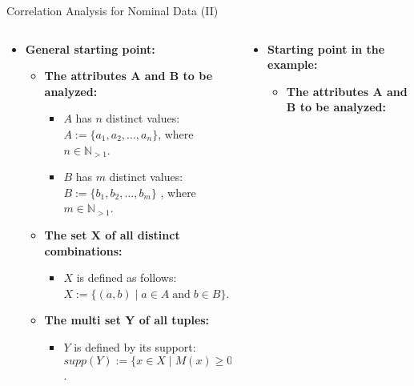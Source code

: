 \begin{frame}{Correlation Analysis for Nominal Data (II)}
	\begin{columns}
		\begin{column}{0.5\textwidth}
			\begin{itemize}
				\item \textbf{General starting point:}
				      \begin{itemize}
					      \item \textbf{The attributes A and B to be analyzed:}
					            \begin{itemize}
						            \item $A$ has $n$ distinct values: $A :=
							                  \{a_1, a_2, \ldots, a_n\}$, where $n \in
							                  \mathbb{N}_{>1}$.
						            \item $B$ has $m$ distinct values: $B :=
							                  \{b_1, b_2, \ldots, b_m\}$ , where $m \in
							                  \mathbb{N}_{>1}$.
					            \end{itemize}
					      \item \textbf{The set X of all distinct combinations:}
					            \begin{itemize}
						            \item $X$ is defined as follows: \\
						                  $X := \{(a, b) \; \vert \; a \in A \;
							                  \text{and} \; b \in B\}$.
					            \end{itemize}
					      \item \textbf{The multi set Y of all tuples:}
					            \begin{itemize}
						            \item $Y$ is defined by its
						                  support: \\
						                  $supp(Y) := \{x \in X  \; \vert \; M(x) \geq
							                  0\}$.
					            \end{itemize}
				      \end{itemize}
			\end{itemize}
		\end{column}
		\begin{column}{0.5\textwidth}
			\begin{itemize}
				\item \textbf{Starting point in the example:}
				      \begin{itemize}
					      \item \textbf{The attributes A and B to be analyzed:}

\end{itemize}
\end{itemize}
\end{column}
\end{columns}
\end{frame}
